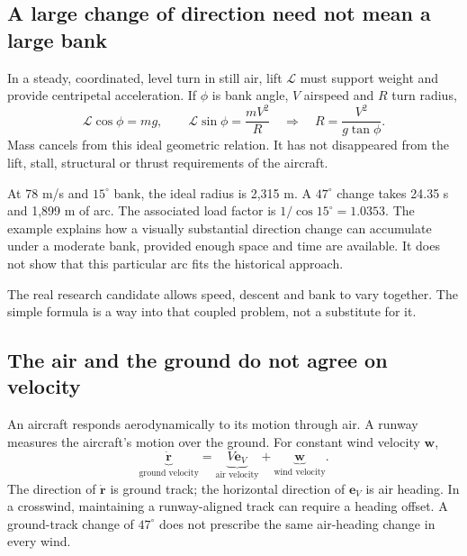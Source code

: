\label{part:3}
\subsection*{A large change of direction need not mean a large bank}
In a steady, coordinated, level turn in still air, lift $\mathcal L$ must support weight and provide centripetal acceleration. If $\phi$ is bank angle, $V$ airspeed and $R$ turn radius,
\begin{equation}
\mathcal L\cos\phi=mg,\qquad \mathcal L\sin\phi=\frac{mV^2}{R}
\quad\Longrightarrow\quad R=\frac{V^2}{g\tan\phi}.
\label{eq:turn}
\end{equation}
Mass cancels from this ideal geometric relation. It has not disappeared from the lift, stall, structural or thrust requirements of the aircraft.


At 78 m/s and $15^\circ$ bank, the ideal radius is 2,315 m. A $47^\circ$ change takes 24.35 s and 1,899 m of arc. The associated load factor is $1/\cos15^\circ=1.0353$. The example explains how a visually substantial direction change can accumulate under a moderate bank, provided enough space and time are available. It does not show that this particular arc fits the historical approach.


The real research candidate allows speed, descent and bank to vary together. The simple formula is a way into that coupled problem, not a substitute for it.
\par\medskip
\subsection*{The air and the ground do not agree on velocity}
An aircraft responds aerodynamically to its motion through air. A runway measures the aircraft's motion over the ground. For constant wind velocity $\mathbf w$,
\begin{equation}
\underbrace{\dot{\mathbf r}}_{\text{ground velocity}}
=\underbrace{V\mathbf e_V}_{\text{air velocity}}+\underbrace{\mathbf w}_{\text{wind velocity}}.
\label{eq:wind}
\end{equation}
The direction of $\dot{\mathbf r}$ is ground track; the horizontal direction of $\mathbf e_V$ is air heading. In a crosswind, maintaining a runway-aligned track can require a heading offset. A ground-track change of $47^\circ$ does not prescribe the same air-heading change in every wind.

